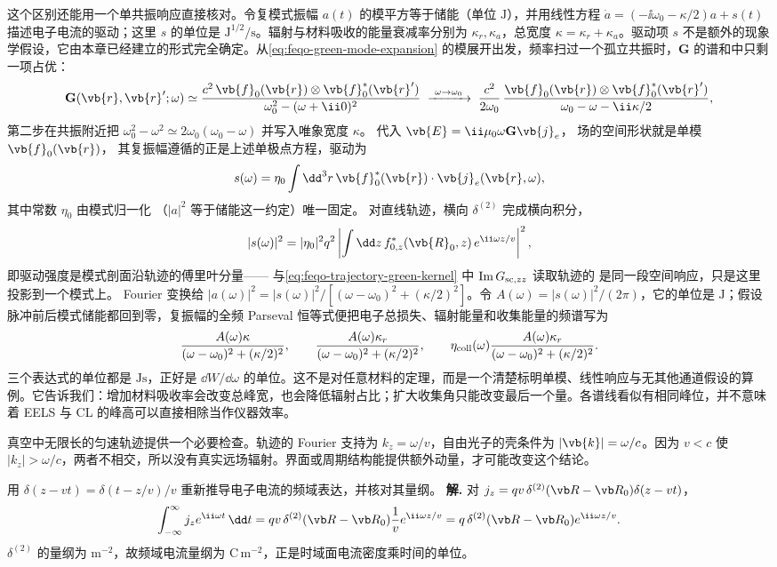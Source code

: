 这个区别还能用一个单共振响应直接核对。令复模式振幅 \(a(t)\) 的模平方等于储能（单位 \(\si{\joule}\)），并用线性方程 \(\dot a=(-\ii\omega_0-\kappa/2)a+s(t)\) 描述电子电流的驱动；这里 \(s\) 的单位是 \(\si{\joule}^{1/2}\si{\per\second}\)。辐射与材料吸收的能量衰减率分别为 \(\kappa_r,\kappa_a\)，总宽度 \(\kappa=\kappa_r+\kappa_a\)。驱动项 \(s\) 不是额外的现象学假设，它由本章已经建立的形式完全确定。从\cref{eq:feqo-green-mode-expansion} 的模展开出发，频率扫过一个孤立共振时，\(\mathbf G\) 的谱和中只剩一项占优：
\[
\mathbf G(\vb{r},\vb{r}';\omega)\simeq
\frac{c^2\,\vb{f}_0(\vb{r})\otimes\vb{f}_0^*(\vb{r}')}
{\omega_0^2-(\omega+\ii0)^2}
\;\xrightarrow{\ \omega\to\omega_0\ }\;
\frac{c^2}{2\omega_0}\,
\frac{\vb{f}_0(\vb{r})\otimes\vb{f}_0^*(\vb{r}')}
{\omega_0-\omega-\ii\kappa/2},
\]
第二步在共振附近把
\(\omega_0^2-\omega^2\simeq2\omega_0(\omega_0-\omega)\)
并写入唯象宽度 \(\kappa\)。
代入 \(\vb{E}=\ii\mu_0\omega\mathbf G\vb{j}_e\)，
场的空间形状就是单模 \(\vb{f}_0(\vb{r})\)，
其复振幅遵循的正是上述单极点方程，驱动为
\[
s(\omega)=\eta_0\int\dd^3r\,
\vb{f}_0^*(\vb{r})\cdot\vb{j}_e(\vb{r},\omega),
\]
其中常数 \(\eta_0\) 由模式归一化
（\(|a|^2\) 等于储能这一约定）唯一固定。
对直线轨迹，横向 \(\delta^{(2)}\) 完成横向积分，
\[
|s(\omega)|^2=|\eta_0|^2q^2
\left|\int\dd z\,f_{0,z}^*(\vb{R}_0,z)\,
e^{\ii\omega z/v}\right|^2 ,
\]
即驱动强度是模式剖面沿轨迹的傅里叶分量——
与\cref{eq:feqo-trajectory-green-kernel} 中
\(\operatorname{Im}G_{{\rm sc},zz}\) 读取轨迹的
是同一段空间响应，只是这里投影到一个模式上。
Fourier 变换给 \(|a(\omega)|^2=|s(\omega)|^2/[(\omega-\omega_0)^2+(\kappa/2)^2]\)。令 \(A(\omega)=|s(\omega)|^2/(2\pi)\)，它的单位是 \(\si{\joule}\)；假设脉冲前后模式储能都回到零，复振幅的全频 Parseval 恒等式便把电子总损失、辐射能量和收集能量的频谱写为
\[
\frac{A(\omega)\kappa}{(\omega-\omega_0)^2+(\kappa/2)^2},\qquad
\frac{A(\omega)\kappa_r}{(\omega-\omega_0)^2+(\kappa/2)^2},\qquad
\eta_{\rm coll}(\omega)
\frac{A(\omega)\kappa_r}{(\omega-\omega_0)^2+(\kappa/2)^2}.
\]
三个表达式的单位都是 \(\si{\joule\second}\)，正好是 \(\dd W/\dd\omega\) 的单位。这不是对任意材料的定理，而是一个清楚标明单模、线性响应与无其他通道假设的算例。它告诉我们：增加材料吸收率会改变总峰宽，也会降低辐射占比；扩大收集角只能改变最后一个量。各谱线看似有相同峰位，并不意味着 EELS 与 CL 的峰高可以直接相除当作仪器效率。

真空中无限长的匀速轨迹提供一个必要检查。轨迹的 Fourier 支持为 \(k_z=\omega/v\)，自由光子的壳条件为 \(|\vb{k}|=\omega/c\)。因为 \(v<c\) 使 \(|k_z|>\omega/c\)，两者不相交，所以没有真实远场辐射。界面或周期结构能提供额外动量，才可能改变这个结论。



\par
\begin{workedexample}
用 \(\delta(z-vt)=\delta(t-z/v)/v\) 重新推导电子电流的频域表达，并核对其量纲。
\textbf{解.} 对 \(j_z=qv\,\delta^{(2)}(\vb R-\vb R_0)\delta(z-vt)\)，
\[
\int_{-\infty}^{\infty}j_z e^{\ii\omega t}\,\dd t
=qv\,\delta^{(2)}(\vb R-\vb R_0)\frac1v e^{\ii\omega z/v}
=q\,\delta^{(2)}(\vb R-\vb R_0)e^{\ii\omega z/v}.
\]
\(\delta^{(2)}\) 的量纲为 \(\mathrm m^{-2}\)，故频域电流量纲为 \(\mathrm{C\,m^{-2}}\)，正是时域面电流密度乘时间的单位。
\end{workedexample}
\par
